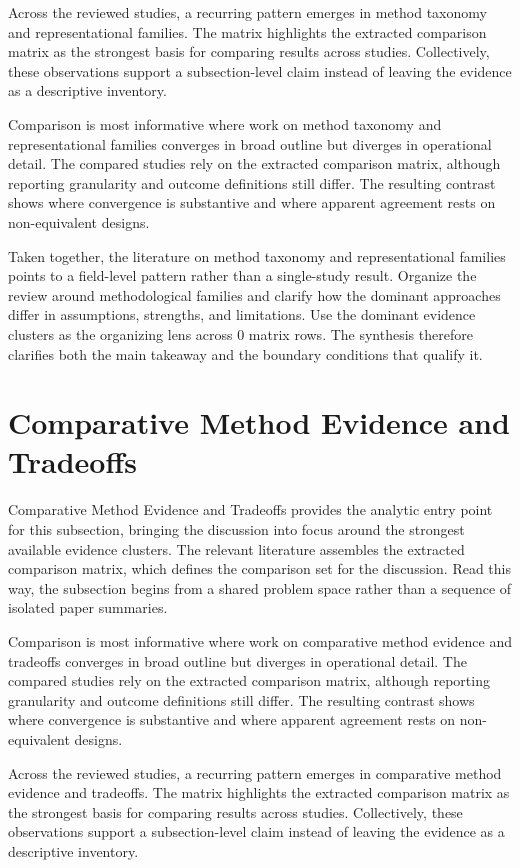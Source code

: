 \documentclass{article}
\begin{document}
Across the reviewed studies, a recurring pattern emerges in method taxonomy and representational families. The matrix highlights the extracted comparison matrix as the strongest basis for comparing results across studies. Collectively, these observations support a subsection-level claim instead of leaving the evidence as a descriptive inventory.

Comparison is most informative where work on method taxonomy and representational families converges in broad outline but diverges in operational detail. The compared studies rely on the extracted comparison matrix, although reporting granularity and outcome definitions still differ. The resulting contrast shows where convergence is substantive and where apparent agreement rests on non-equivalent designs.

Taken together, the literature on method taxonomy and representational families points to a field-level pattern rather than a single-study result. Organize the review around methodological families and clarify how the dominant approaches differ in assumptions, strengths, and limitations. Use the dominant evidence clusters as the organizing lens across 0 matrix rows. The synthesis therefore clarifies both the main takeaway and the boundary conditions that qualify it.

\section{Comparative Method Evidence and Tradeoffs}
Comparative Method Evidence and Tradeoffs provides the analytic entry point for this subsection, bringing the discussion into focus around the strongest available evidence clusters. The relevant literature assembles the extracted comparison matrix, which defines the comparison set for the discussion. Read this way, the subsection begins from a shared problem space rather than a sequence of isolated paper summaries.

Comparison is most informative where work on comparative method evidence and tradeoffs converges in broad outline but diverges in operational detail. The compared studies rely on the extracted comparison matrix, although reporting granularity and outcome definitions still differ. The resulting contrast shows where convergence is substantive and where apparent agreement rests on non-equivalent designs.

Across the reviewed studies, a recurring pattern emerges in comparative method evidence and tradeoffs. The matrix highlights the extracted comparison matrix as the strongest basis for comparing results across studies. Collectively, these observations support a subsection-level claim instead of leaving the evidence as a descriptive inventory.
\end{document}
